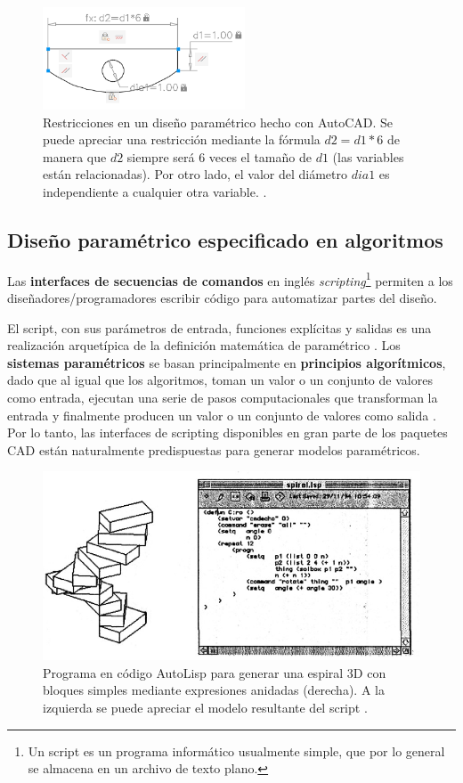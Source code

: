 \begin{figure}[ht]
\includegraphics[width=6cm]{Img/CPD/autocad-0.png}
\centering
\caption{\footnotesize{Restricciones en un diseño paramétrico hecho con AutoCAD. Se puede apreciar una restricción mediante la fórmula $d2 = d1*6$ de manera que $d2$ siempre será 6 veces el tamaño de $d1$ (las variables están relacionadas). Por otro lado, el valor del diámetro $dia1$ es independiente a cualquier otra variable. \citep{Autodesk2017}.}}
\label{fig:autocad-0}
\end{figure}

\subsection{Diseño paramétrico especificado en algoritmos} 
\label{dis:script}
 
Las \textbf{interfaces de secuencias de comandos} en inglés \textit{scripting}\footnote{Un script es un programa informático usualmente simple, que por lo general se almacena en un archivo de texto plano. } permiten a los diseñadores/programadores escribir código para automatizar partes del diseño.

El script, con sus parámetros de entrada, funciones explícitas y salidas es una realización arquetípica de la definición matemática de paramétrico \citep{burry2012new}.
Los \textbf{sistemas paramétricos} se basan principalmente en \textbf{principios algorítmicos}, dado que al igual que los algoritmos, toman un valor o un conjunto de valores como entrada, ejecutan una serie de pasos computacionales que transforman la entrada y finalmente producen un valor o un conjunto de valores como salida \citep{Dino2012}. Por lo tanto, las interfaces de scripting disponibles en gran parte de los paquetes CAD están naturalmente predispuestas para generar modelos paramétricos.\newline



\begin{figure}[ht]
\includegraphics[width=12cm]{Img/CPD/cad-autolisp.jpg}
\centering
\caption{\footnotesize{Programa en código AutoLisp para generar una espiral 3D con bloques simples mediante expresiones anidadas  (derecha). A la izquierda se puede apreciar el modelo resultante del script \citep{Celani2008}.}}
\end{figure}


